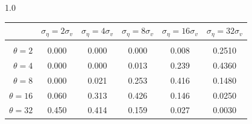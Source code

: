 \documentclass[12pt]{article}
\begin{document}
\begin{table}[h!]
\vspace{10pt}
\begin{subtable}{1.0\textwidth}
    \centering
\begin{tabular}{rccccc}
\hline  
            & \multicolumn{1}{l}{$\sigma_{\eta} =2\sigma_{v}$} & \multicolumn{1}{l}{$\sigma_{\eta} =4\sigma_{v}$} & \multicolumn{1}{l}{$\sigma_{\eta} =8\sigma_{v}$} & \multicolumn{1}{l}{$\sigma_{\eta} =16\sigma_{v}$} & \multicolumn{1}{l}{$\sigma_{\eta} =32\sigma_{v}$} \\ \hline  \vspace{-3mm} \\        
$\theta=2$  & 0.000                                             & 0.000                                             & 0.000                                             & 0.008                                              & 0.2510                                             \\ \hline
$\theta=4$  & 0.000                                             & 0.000                                             & 0.013                                             & 0.239                                              & 0.4360                                             \\ \hline
$\theta=8$  & 0.000                                             & 0.021                                             & 0.253                                             & 0.416                                              & 0.1480                                             \\ \hline
$\theta=16$ & 0.060                                             & 0.313                                             & 0.426                                             & 0.146                                              & 0.0250                                             \\ \hline
$\theta=32$ & 0.450                                             & 0.414                                             & 0.159                                             & 0.027                                              & 0.0030                                             \\ \hline
\end{tabular}
\end{subtable}


\end{table}
\end{document}
